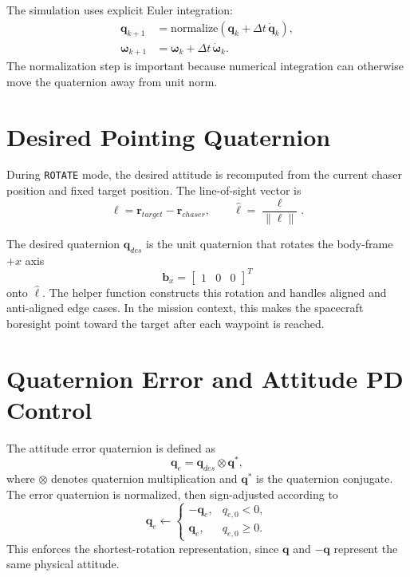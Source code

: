 \documentclass[11pt]{article}
\begin{document}
The simulation uses explicit Euler integration:
\begin{align}
    \bm{q}_{k+1} &=
    \mathrm{normalize}
    \left(
    \bm{q}_k + \Delta t\,\dot{\bm{q}}_k
    \right),\\
    \bm{\omega}_{k+1} &=
    \bm{\omega}_k + \Delta t\,\dot{\bm{\omega}}_k.
\end{align}
The normalization step is important because numerical integration can otherwise move the quaternion away from unit norm.

\section{Desired Pointing Quaternion}

During \texttt{ROTATE} mode, the desired attitude is recomputed from the current chaser position and fixed target position. The line-of-sight vector is
\begin{equation}
    \bm{\ell}
    =
    \bm{r}_{target} - \bm{r}_{chaser},
    \qquad
    \hat{\bm{\ell}}
    =
    \frac{\bm{\ell}}{\|\bm{\ell}\|}.
\end{equation}

The desired quaternion \(\bm{q}_{des}\) is the unit quaternion that rotates the body-frame \(+x\) axis
\begin{equation}
    \bm{b}_x =
    \begin{bmatrix}
    1 & 0 & 0
    \end{bmatrix}^{T}
\end{equation}
onto \(\hat{\bm{\ell}}\). The helper function  constructs this rotation and handles aligned and anti-aligned edge cases. In the mission context, this makes the spacecraft boresight point toward the target after each waypoint is reached.

\section{Quaternion Error and Attitude PD Control}

The attitude error quaternion is defined as
\begin{equation}
    \bm{q}_e
    =
    \bm{q}_{des}\otimes\bm{q}^{*},
\end{equation}
where \(\otimes\) denotes quaternion multiplication and \(\bm{q}^{*}\) is the quaternion conjugate. The error quaternion is normalized, then sign-adjusted according to
\begin{equation}
    \bm{q}_e \leftarrow
    \begin{cases}
    -\bm{q}_e, & q_{e,0}<0,\\
    \bm{q}_e, & q_{e,0}\geq 0.
    \end{cases}
\end{equation}
This enforces the shortest-rotation representation, since \(\bm{q}\) and \(-\bm{q}\) represent the same physical attitude.
\end{document}
